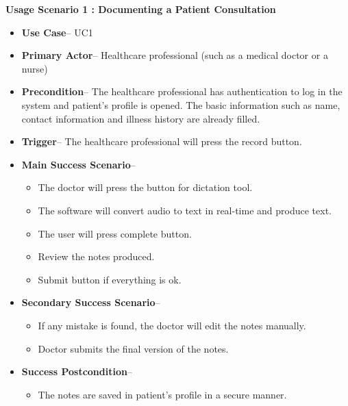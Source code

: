 \documentclass[12pt]{article}
\begin{document}
\textbf{Usage Scenario 1 : Documenting a Patient Consultation}

\begin{itemize}
  \item\textbf{Use Case}-- UC1
  \item\textbf{Primary Actor}-- Healthcare professional (such as a medical doctor or a nurse)
  \item\textbf{Precondition}-- The healthcare professional has authentication to log in the system and patient’s profile is opened. The basic information such as name, contact information and illness history are already filled.
  \item\textbf{Trigger}-- The healthcare professional will press the record button.
  \item\textbf{Main Success Scenario}--
  \begin{itemize}
    \item{The doctor will press the button for dictation tool.}
    \item{The software will convert audio to text in real-time and produce text.}
    \item{The user will press complete button.}
    \item{Review the notes produced.}
    \item{Submit button if everything is ok.}
  \end{itemize}
  \item\textbf{Secondary Success Scenario}--
  \begin{itemize}[label=6.\arabic*]
    \item{If any mistake is found, the doctor will edit the notes manually.}
    \item{Doctor submits the final version of the notes.}
  \end{itemize}
  \item\textbf{Success Postcondition}--
  \begin{itemize}
    \item{The notes are saved in patient’s profile in a secure manner.}
  \end{itemize}
\end{itemize}
\end{document}
